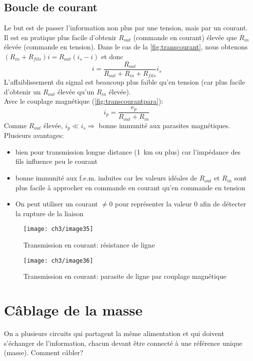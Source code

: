 \subsection{Boucle de courant}
Le but est de passer l'information non plus par une tension, mais par un courant. Il est en pratique plus facile d'obtenir \(R_{out}\) (commande en courant) élevée que \(R_{in}\) élevée (commande en tension). Dans le cas de la \autoref{fig:transcourant}, nous obtenons \((R_{in}+R_{fils})i = R_{out}(i_s-i)\) et donc
\[i=\frac{R_{out}}{R_{out}+R_{in}+R_{fils}}i_s\]
L'affaiblissement du signal est beaucoup plus faible qu'en tension (car plus facile d'obtenir un \(R_{out}\) élevée qu'un \(R_{in}\) élevée).\\
Avec le couplage magnétique (\autoref{fig:transcourantpara}):
\[i_p=\frac{e_p}{R_{out}+R_{in}}\]
Comme \(R_{out}\) élevée, \(i_p\ll i_s \Rightarrow\) bonne immunité aux parasites magnétiques.\\
Plusieurs avantages:
\begin{itemize}
	\item bien pour transmission longue distance (\SI{1}{\kilo\meter} ou plus) car l'impédance des fils influence peu le courant
	\item bonne immunité aux f.e.m. induites car les valeurs idéales de \(R_{out}\text{ et }R_{in}\) sont plus facile à approcher en commande en courant qu'en commande en tension
	\item On peut utiliser un courant \(\neq0\) pour représenter la valeur 0 afin de détecter la rupture de la liaison
\end{itemize}
\begin{figure}[H] 
	\centering 
	\texttt{[image: ch3/image35]} 
	\caption{Transmission en courant: résistance de ligne} 
	\label{fig:transcourant}
\end{figure}
\begin{figure}[H] 
	\centering 
	\texttt{[image: ch3/image36]} 
	\caption{Transmission en courant: parasite de ligne par couplage magnétique} 
	\label{fig:transcourantpara}
\end{figure}
\section{Câblage de la masse}
On a plusieurs circuits qui partagent la même alimentation et qui doivent s'échanger de l'information, chacun devant être connecté à une référence unique (masse). Comment câbler?
